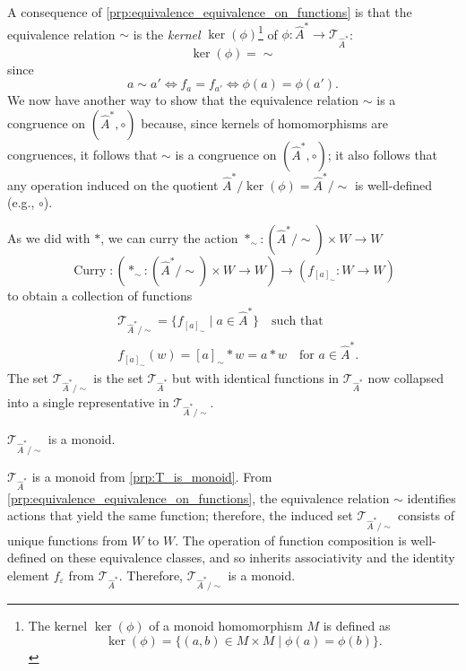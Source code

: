 A consequence of \cref{prp:equivalence_equivalence_on_functions} is that the equivalence relation $\sim$ is the \emph{kernel} $\operatorname{ker}(\phi)$\footnote{
The kernel $\operatorname{ker}(\phi)$ of a monoid homomorphism $M$ is defined as
\begin{equation}
    \operatorname{ker}(\phi) = \{(a,b) \in M \times M \mid \phi(a) = \phi(b) \}.
\end{equation}
} of $\phi: \hat{A}^{*} \to \mathcal{T}_{\hat{A}^{*}}$:
\begin{equation}
    \operatorname{ker}(\phi) = \sim
\end{equation}
since
\begin{equation}
    a \sim a' \iff f_{a} = f_{a'} \iff \phi(a) = \phi(a').
\end{equation}
We now have another way to show that the equivalence relation $\sim$ is a congruence on $(\hat{A}^{*}, \circ)$ because, since kernels of homomorphisms are congruences, it follows that $\sim$ is a congruence on $(\hat{A}^{*}, \circ)$; it also follows that any operation induced on the quotient $\hat{A}^{*}/\operatorname{ker}(\phi) = \hat{A}^{*}/\sim$ is well-defined (e.g., $\circ$).

As we did with $\ast$, we can curry the action $\ast_{\sim}: (\hat{A}^{\ast}/\sim) \times W \to W$
\begin{equation}
    \operatorname{Curry}: (\ast_{\sim}: (\hat{A}^{\ast}/\sim) \times W \to W) \to (f_{[a]_{\sim}}: W \to W)
\end{equation}
to obtain a collection of functions
\begin{equation}
\begin{aligned}
     & \mathcal{T}_{\hat{A}^{\ast}/\sim} = \{ f_{[a]_{\sim}} \mid a \in \hat{A}^{\ast} \} \quad \text{such that} \\
     & f_{[a]_{\sim}}(w) = [a]_{\sim} \ast w = a \ast w \quad \text{for $a \in \hat{A}^{\ast}$}.
\end{aligned}
\end{equation}
The set $\mathcal{T}_{\hat{A}^{\ast}/\sim}$ is the set $\mathcal{T}_{\hat{A}^{\ast}}$ but with identical functions in $\mathcal{T}_{\hat{A}^{\ast}}$ now collapsed into a single representative in $\mathcal{T}_{\hat{A}^{\ast}/\sim}$.

\begin{propositionE}
    $\mathcal{T}_{\hat{A}^{\ast}/\sim}$ is a monoid.
\end{propositionE}
\begin{proofE}
    $\mathcal{T}_{\hat{A}^{\ast}}$ is a monoid from \cref{prp:T_is_monoid}.
    From \cref{prp:equivalence_equivalence_on_functions}, the equivalence relation $\sim$ identifies actions that yield the same function; therefore, the induced set $\mathcal{T}_{\hat{A}^{\ast}/\sim}$ consists of unique functions from $W$ to $W$.
    The operation of function composition is well-defined on these equivalence classes, and so inherits associativity and the identity element $f_{\varepsilon}$ from $\mathcal{T}_{\hat{A}^{\ast}}$.
    Therefore, $\mathcal{T}_{\hat{A}^{\ast}/\sim}$ is a monoid.
\end{proofE}

